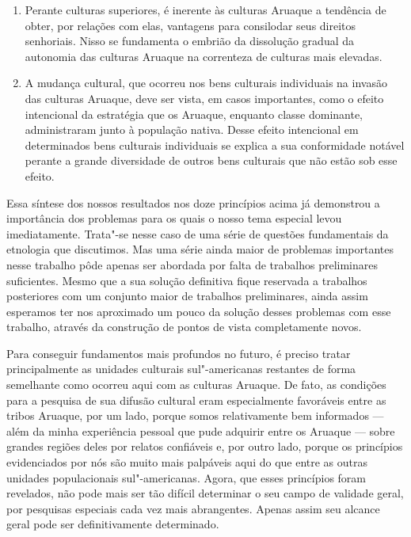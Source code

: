 \begin{enumerate}
  paulatina de relações de dependência.
\item
  Perante culturas superiores, é inerente às culturas Aruaque a
  tendência de obter, por relações com elas, vantagens para consilodar
  seus direitos senhoriais. Nisso se fundamenta o embrião da dissolução
  gradual da autonomia das culturas Aruaque na correnteza de culturas
  mais elevadas.
\item
  A mudança cultural, que ocorreu nos bens culturais individuais na
  invasão das culturas Aruaque, deve ser vista, em casos importantes,
  como o efeito intencional da estratégia que os Aruaque, enquanto
  classe dominante, administraram junto à população nativa. Desse
  efeito intencional em determinados bens culturais individuais se
  explica a sua conformidade notável perante a grande diversidade de
  outros bens culturais que não estão sob esse efeito.
\end{enumerate}

Essa síntese dos nossos resultados nos doze princípios acima já
demonstrou a importância dos problemas para os quais o nosso tema
especial levou imediatamente. Trata"-se nesse caso de uma série de
questões fundamentais da etnologia que discutimos. Mas uma série ainda
maior de problemas importantes nesse trabalho pôde apenas ser abordada
por falta de trabalhos preliminares suficientes. Mesmo que a sua solução
definitiva fique reservada a trabalhos posteriores com um conjunto maior
de trabalhos preliminares, ainda assim esperamos ter nos aproximado um
pouco da solução desses problemas com esse trabalho, através da
construção de pontos de vista completamente novos.

Para conseguir fundamentos mais profundos no futuro, é preciso tratar
principalmente as unidades culturais sul"-americanas restantes de forma
semelhante como ocorreu aqui com as culturas Aruaque. De fato, as
condições para a pesquisa de sua difusão cultural eram especialmente
favoráveis entre as tribos Aruaque, por um lado, porque somos
relativamente bem informados --- além da minha experiência pessoal que
pude adquirir entre os Aruaque --- sobre grandes regiões deles por
relatos confiáveis e, por outro lado, porque os princípios evidenciados
por nós são muito mais palpáveis aqui do que entre as outras unidades
populacionais sul"-americanas. Agora, que esses princípios foram
revelados, não pode mais ser tão difícil determinar o seu campo de
validade geral, por pesquisas especiais cada vez mais abrangentes.
Apenas assim seu alcance geral pode ser definitivamente determinado.

